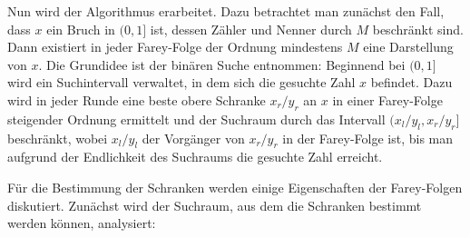 Nun wird der Algorithmus erarbeitet.
Dazu betrachtet man zunächst den Fall, dass $x$ ein Bruch in $(0,1]$ ist, dessen Zähler und Nenner durch $M$ beschränkt sind.
Dann existiert in jeder Farey-Folge der Ordnung mindestens $M$ eine Darstellung von $x$.
Die Grundidee ist der binären Suche entnommen:
Beginnend bei $(0,1]$ wird ein Suchintervall verwaltet, in dem sich die gesuchte Zahl $x$ befindet.
Dazu wird in jeder Runde eine beste obere Schranke $x_r/y_r$ an $x$ in einer Farey-Folge steigender Ordnung ermittelt und der Suchraum durch das Intervall $(x_l/y_l, x_r/y_r]$ beschränkt, wobei $x_l/y_l$ der Vorgänger von $x_r/y_r$ in der Farey-Folge ist, bis man aufgrund der Endlichkeit des Suchraums die gesuchte Zahl erreicht.

Für die Bestimmung der Schranken werden einige Eigenschaften der Farey-Folgen diskutiert.
Zunächst wird der Suchraum, aus dem die Schranken bestimmt werden können, analysiert:

